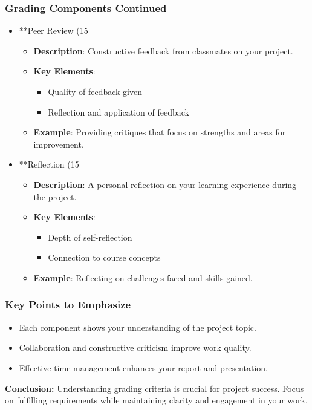 \documentclass{beamer}
\begin{document}
\begin{frame}[fragile]
    \frametitle{Grading Components Continued}
    \begin{itemize}
        \item **Peer Review (15%
            \begin{itemize}
                \item \textbf{Description}: Constructive feedback from classmates on your project.
                \item \textbf{Key Elements}:
                \begin{itemize}
                    \item Quality of feedback given
                    \item Reflection and application of feedback
                \end{itemize}
                \item \textbf{Example}: Providing critiques that focus on strengths and areas for improvement.
            \end{itemize}

        \item **Reflection (15%
            \begin{itemize}
                \item \textbf{Description}: A personal reflection on your learning experience during the project.
                \item \textbf{Key Elements}:
                \begin{itemize}
                    \item Depth of self-reflection
                    \item Connection to course concepts
                \end{itemize}
                \item \textbf{Example}: Reflecting on challenges faced and skills gained.
            \end{itemize}
    \end{itemize}
\end{frame}

\begin{frame}[fragile]
    \frametitle{Key Points to Emphasize}
    \begin{itemize}
        \item Each component shows your understanding of the project topic.
        \item Collaboration and constructive criticism improve work quality.
        \item Effective time management enhances your report and presentation.
    \end{itemize}

    \textbf{Conclusion:} Understanding grading criteria is crucial for project success. Focus on fulfilling requirements while maintaining clarity and engagement in your work.
\end{frame}
\end{document}
